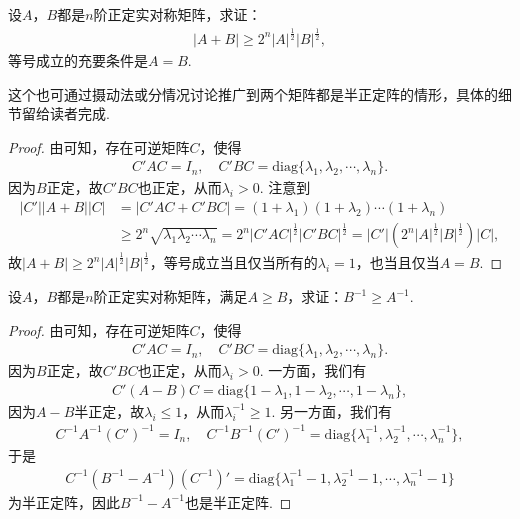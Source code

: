 \documentclass[../../main.tex]{subfiles}
\begin{document}
\begin{proposition}\label{proposition:例9.77}
设\(A\)，\(B\)都是\(n\)阶正定实对称矩阵，求证：
\begin{align*}
\vert A + B\vert\geqslant 2^n\vert A\vert^{\frac{1}{2}}\vert B\vert^{\frac{1}{2}},
\end{align*}
等号成立的充要条件是\(A = B\).
\end{proposition}
\begin{remark}
这个也可通过摄动法或分情况讨论推广到两个矩阵都是半正定阵的情形，具体的细节留给读者完成. 
\end{remark}
\begin{proof}
由可知，存在可逆矩阵\(C\)，使得
\begin{align*}
C'AC = I_n,\quad C'BC = \mathrm{diag}\{\lambda_1,\lambda_2,\cdots,\lambda_n\}.
\end{align*}
因为\(B\)正定，故\(C'BC\)也正定，从而\(\lambda_i>0\). 注意到
\begin{align*}
\vert C'\vert\vert A + B\vert\vert C\vert&=\vert C'AC + C'BC\vert=(1 + \lambda_1)(1 + \lambda_2)\cdots(1 + \lambda_n)\\
&\geqslant 2^n\sqrt{\lambda_1\lambda_2\cdots\lambda_n}=2^n\vert C'AC\vert^{\frac{1}{2}}\vert C'BC\vert^{\frac{1}{2}}=\vert C'\vert(2^n\vert A\vert^{\frac{1}{2}}\vert B\vert^{\frac{1}{2}})\vert C\vert,
\end{align*}
故\(\vert A + B\vert\geqslant 2^n\vert A\vert^{\frac{1}{2}}\vert B\vert^{\frac{1}{2}}\)，等号成立当且仅当所有的\(\lambda_i = 1\)，也当且仅当\(A = B\).

\end{proof}

\begin{example}\label{example:例9.78}
设\(A\)，\(B\)都是\(n\)阶正定实对称矩阵，满足\(A\geqslant  B\)，求证：\(B^{-1}\geqslant  A^{-1}\).
\end{example}
\begin{proof}
由可知，存在可逆矩阵\(C\)，使得
\begin{align*}
C'AC = I_n,\quad C'BC = \mathrm{diag}\{\lambda_1,\lambda_2,\cdots,\lambda_n\}.
\end{align*}
因为\(B\)正定，故\(C'BC\)也正定，从而\(\lambda_i>0\). 一方面，我们有
\begin{align*}
C'(A - B)C = \mathrm{diag}\{1 - \lambda_1,1 - \lambda_2,\cdots,1 - \lambda_n\},
\end{align*}
因为\(A - B\)半正定，故\(\lambda_i\leqslant 1\)，从而\(\lambda_i^{-1}\geqslant 1\). 另一方面，我们有
\begin{align*}
C^{-1}A^{-1}(C')^{-1} = I_n,\quad C^{-1}B^{-1}(C')^{-1} = \mathrm{diag}\{\lambda_1^{-1},\lambda_2^{-1},\cdots,\lambda_n^{-1}\},
\end{align*}
于是
\begin{align*}
C^{-1}(B^{-1} - A^{-1})(C^{-1})' = \mathrm{diag}\{\lambda_1^{-1} - 1,\lambda_2^{-1} - 1,\cdots,\lambda_n^{-1} - 1\}
\end{align*}
为半正定阵，因此\(B^{-1} - A^{-1}\)也是半正定阵.

\end{proof}
\end{document}
